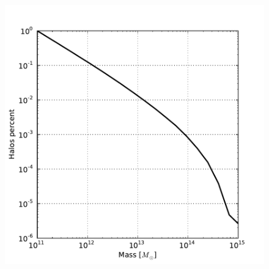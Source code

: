 \documentclass[usenatbib]{latex/mn2e}
\begin{document}
\begin{flushleft}
\begin{figure}
\begin{center}

  \includegraphics[keepaspectratio=true,width=0.35\textheight]
  {./figures/integrated_mass_halos.pdf}


  \label{fig:IMF_Bolshoi}
  \vspace{0.1 cm}

\end{center}
\end{figure}
\end{flushleft}
\end{document}
